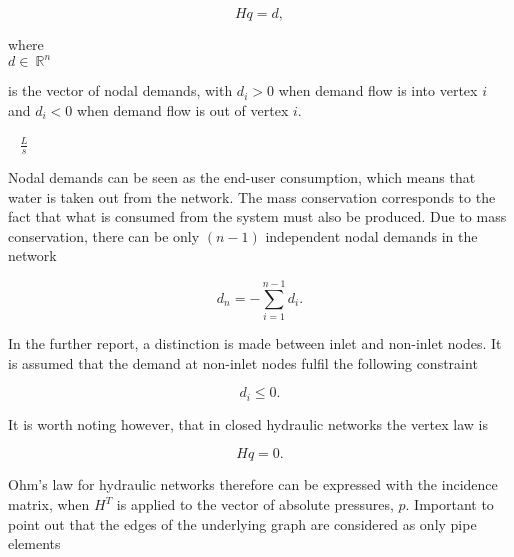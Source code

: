 \begin{equation}
  \label{vertexlaw_open}
  Hq = d,
\end{equation}

  \begin{minipage}[t]{0.20\textwidth}
where\\
\hspace*{8mm} $d \in \: \mathbb{R}^{n}$ 
\end{minipage}
\begin{minipage}[t]{0.68\textwidth}
\vspace*{2mm}
is the vector of nodal demands, with $d_i > 0$ when demand flow is into vertex $i$ and $d_i < 0$ when demand flow is out of vertex $i$.
\end{minipage}
\begin{minipage}[t]{0.10\textwidth}
\vspace*{2mm}
\textcolor{White}{te}$\unit{\frac{L}{s}}$
\end{minipage}

Nodal demands can be seen as the end-user consumption, which means that water is taken out from the network. The mass conservation corresponds to the fact that what is consumed from the system must also be produced. Due to mass conservation, there can be only $(n-1)$ independent nodal demands in the network

\begin{equation}
  \label{mass_conservation}
  d_n = - \sum_{i=1}^{n-1} d_i.
\end{equation}

In the further report, a distinction is made between inlet and non-inlet nodes. It is assumed that the demand at non-inlet nodes fulfil the following constraint

\begin{equation}
  \label{non_inlet_constraint}
  d_i \leq 0.
\end{equation}

It is worth noting however, that in closed hydraulic networks the vertex law is

\begin{equation}
  \label{vertexlaw_closed}
  Hq = 0.
\end{equation}

Ohm's law for hydraulic networks therefore can be expressed with the incidence matrix, when $H^T$ is applied to the vector of absolute pressures, $p$. Important to point out that the edges of the underlying graph are considered as only pipe elements

